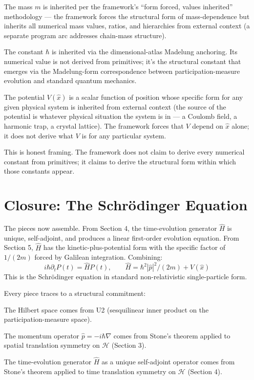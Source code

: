 \documentclass[11pt,a4paper]{article}
\begin{document}
The mass $m$ is inherited per the framework's ``form forced, values inherited'' methodology --- the framework forces the structural form of mass-dependence but inherits all numerical mass values, ratios, and hierarchies from external context (a separate program arc addresses chain-mass structure).

The constant $\hbar$ is inherited via the dimensional-atlas Madelung anchoring. Its numerical value is not derived from primitives; it's the structural constant that emerges via the Madelung-form correspondence between participation-measure evolution and standard quantum mechanics.

The potential $V(\hat{x})$ is a scalar function of position whose specific form for any given physical system is inherited from external context (the source of the potential is whatever physical situation the system is in --- a Coulomb field, a harmonic trap, a crystal lattice). The framework forces that $V$ depend on $\hat{x}$ alone; it does not derive what $V$ is for any particular system.

This is honest framing. The framework does not claim to derive every numerical constant from primitives; it claims to derive the structural form within which those constants appear.

\section{Closure: The Schr\"odinger Equation}

The pieces now assemble. From Section 4, the time-evolution generator $\hat{H}$ is unique, self-adjoint, and produces a linear first-order evolution equation. From Section 5, $\hat{H}$ has the kinetic-plus-potential form with the specific factor of $1/(2m)$ forced by Galilean integration. Combining:
\[
i\hbar \partial_t P(t) = \hat{H} P(t), \qquad \hat{H} = \hbar^{2} |\hat{p}|^{2} / (2m) + V(\hat{x})
\]
This is the Schr\"odinger equation in standard non-relativistic single-particle form.

Every piece traces to a structural commitment:

The Hilbert space comes from U2 (sesquilinear inner product on the participation-measure space).

The momentum operator $\hat{p} = -i\hbar\nabla$ comes from Stone's theorem applied to spatial translation symmetry on $\mathcal{H}$ (Section 3).

The time-evolution generator $\hat{H}$ as a unique self-adjoint operator comes from Stone's theorem applied to time translation symmetry on $\mathcal{H}$ (Section 4).
\end{document}
